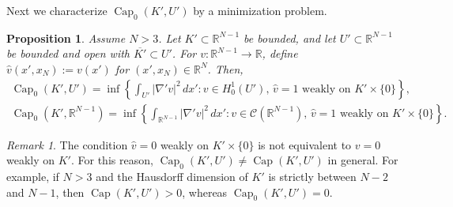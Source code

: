 \documentclass{article}
\numberwithin{equation}{section}
\newtheorem{proposition}[theorem]{Proposition}
\theoremstyle{definition}
\theoremstyle{remark}
\newtheorem{remark}{Remark}[theorem]
\newcommand{\cpct}{\operatorname{Cap}}
\begin{document}
Next we characterize $\cpct_0(K', U')$ by a minimization problem.

\begin{proposition} \label{pr:minimization_problem_characterization}
    Assume $N > 3$. Let $K' \subset \mathbb{R}^{N - 1}$ be bounded, and let $U' \subset \mathbb{R}^{N - 1}$ be bounded and open with $\overline{K'} \subset U'$. For $v : \mathbb{R}^{N - 1} \rightarrow \mathbb{R}$, define $\hat{v}(x', x_N) := v(x')$ for $(x', x_N) \in \mathbb{R}^N$. Then,
    \begin{gather} \label{eq:minimization_problem_characterization}
        \cpct_0(K', U') = \inf \left\{\int_{U'} |\nabla' v|^2 \, dx' : v \in H_0^1(U'), \, \hat{v} = 1 \text{ weakly on $K' \times \{0\}$}\right\}, \\ \label{eq:extended_capacity_3}
        \cpct_0(K', \mathbb{R}^{N - 1}) = \inf \left\{\int_{\mathbb{R}^{N - 1}} |\nabla' v|^2 \, dx': v \in \mathcal{C}(\mathbb{R}^{N - 1}), \, \hat{v} = 1 \text{ weakly on } K' \times \{0\}\right\}.
    \end{gather}
\end{proposition}

\begin{remark}
    The condition $\hat{v} = 0$ weakly on $K' \times \{0\}$ is not equivalent to $v = 0$ weakly on $K'$. For this reason, $\cpct_0(K', U') \neq \cpct(K', U')$ in general. For example, if $N > 3$ and the Hausdorff dimension of $K'$ is strictly between $N - 2$ and $N - 1$, then $\cpct(K', U') > 0$, whereas $\cpct_0(K', U') = 0$.
\end{remark}
\end{document}
